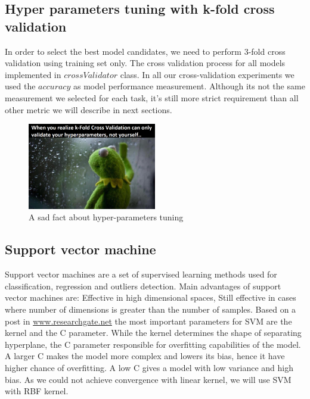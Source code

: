 \documentclass[12pt]{article}
\begin{document}
\subsection{Hyper parameters tuning with k-fold cross validation}
In order to select the best model candidates, we need to perform 3-fold cross validation using training set only. The cross validation process for all models implemented in $crossValidator$ class. In all our cross-validation experiments we used the $accuracy$ as model performance measurement. Although its not the same measurement we selected for each task, it's still more strict requirement than all other metric we will describe in next sections.

\begin{figure}[h]
\centering
\includegraphics[width=0.5\textwidth]{report_pics/frog}
\caption{A sad fact about hyper-parameters tuning}
\end{figure}

\newpage
\subsection{Support vector machine}
Support vector machines are a set of supervised learning methods used for classification, regression and outliers detection. Main advantages of support vector machines are: Effective in high dimensional spaces, Still effective in cases where number of dimensions is greater than the number of samples. Based on a post in  \href{https://www.researchgate.net/post/Is_it_necessary_to_choose_kernels_in_SVM_according_to_application}{www.researchgate.net} the most important parameters for SVM are the kernel and the C parameter. While the kernel determines the shape of separating hyperplane, the C parameter responsible for overfitting capabilities of the model. A larger C makes the model more complex and lowers its bias, hence it have higher chance of overfitting. A low C gives a model with low variance and high bias. As we could not achieve convergence with linear kernel, we will use SVM with RBF kernel.
\end{document}
